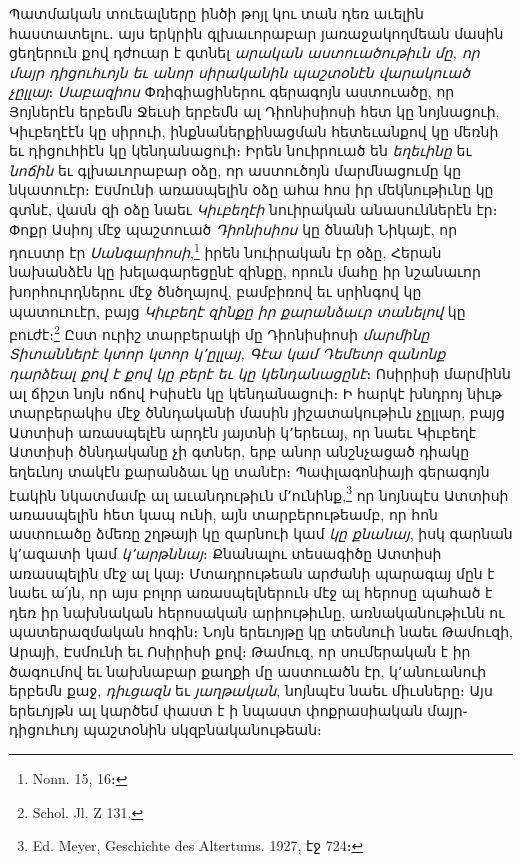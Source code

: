 \documentclass{article}
\begin{document}
{Պատմական տուեալները ինծի թոյլ կու տան դեռ աւելին հաստատելու․ այս երկրին գլխաւորաբար յառաջակողմեան մասին ցեղերուն քով դժուար է գտնել \emph{արական աստուածութիւն մը, որ մայր դիցուհւոյն եւ անոր սիրականին պաշտօնէն վարակուած չըլլայ}։ \emph{Սաբազիոս} Փռիգիացիներու գերագոյն աստուածը, որ Յոյներէն երբեմն Ջեւսի երբեմն ալ Դիոնիսիոսի հետ կը նոյնացուի, Կիւբեղէէն կը սիրուի, ինքնաներքինացման հետեւանքով կը մեռնի եւ դիցուհիէն կը կենդանացուի։ Իրեն նուիրուած են \emph{եղեւինը} եւ \emph{նոճին} եւ գլխաւորաբար օձը, որ աստուծոյն մարմնացումը կը նկատուէր։ Էսմունի առասպելին օձը ահա հոս իր մեկնութիւնը կը գտնէ, վասն զի օձը նաեւ \emph{Կիւբեղէի} նուիրական անասուններէն էր։ Փոքր Ասիոյ մէջ պաշտուած \emph{Դիոնիսիոս} կը ծնանի Նիկայէ, որ դուստր էր \emph{Սանգարիոսի},\footnote{Nonn. 15, 16։} իրեն նուիրական էր օձը, Հերան նախանձէն կը խելագարեցընէ զինքը, որուն մահը իր նշանաւոր խորհուրդներու մէջ ծնծղայով, բամբիռով եւ սրինգով կը պատուուէր, բայց \emph{Կիւբեղէ զինքը իր քարանձաւր տանելով} կը բուժէ։\footnote{Schol. Jl. Z 131.} Ըստ ուրիշ տարբերակի մը Դիոնիսիոսի \emph{մարմինը Տիտաններէ կտոր կտոր կ՚ըլլայ, Գէա կամ Դեմետր զանոնք դարձեալ քով է քով կը բերէ եւ կը կենդանացընէ}։ Ոսիրիսի մարմինն ալ ճիշտ նոյն ոճով Իսիսէն կը կենդանացուի։ Ի հարկէ խնդրոյ նիւթ տարբերակիս մէջ ծննդականի մասին յիշատակութիւն չըլլար, բայց Ատտիսի առասպելէն արդէն յայտնի կ՚երեւայ, որ նաեւ Կիւբեղէ Ատտիսի ծննդականը չի գտներ, երբ անոր անշնչացած դիակը եղեւնոյ տակէն քարանձաւ կը տանէր։ Պափլագոնիայի գերագոյն էակին նկատմամբ ալ աւանդութիւն մ՚ունինք,\footnote{Ed. Meyer, Geschichte des Altertums. 1927, էջ 724։} որ նոյնպէս Ատտիսի առասպելին հետ կապ ունի, այն տարբերութեամբ, որ հոն աստուածը ձմեռը շղթայի կը զարնուի կամ \emph{կը քնանայ}, իսկ գարնան կ՚ազատի կամ \emph{կ՚արթննայ}։ Քնանալու տեսագիծը Ատտիսի առասպելին մէջ ալ կայ։ Մտադրութեան արժանի պարագայ մըն է նաեւ ա՛յն, որ այս բոլոր առասպելներուն մէջ ալ հերոսը պահած է դեռ իր նախնական հերոսական արիութիւնը, առնականութիւնն ու պատերազմական հոգին։ Նոյն երեւոյթը կը տեսնուի նաեւ Թամուզի, Արայի, Էսմունի եւ Ոսիրիսի քով։ Թամուզ, որ սումերական է իր ծագումով եւ նախնաբար քաղքի մը աստուածն էր, կ՚անուանուի երբեմն քաջ, \emph{դիւցազն} եւ \emph{յաղթական}, նոյնպէս նաեւ միւսները։ Այս երեւոյթն ալ կարծեմ փաստ է ի նպաստ փոքրասիական մայր֊դիցուհւոյ պաշտօնին սկզբնականութեան։

}
\end{document}
